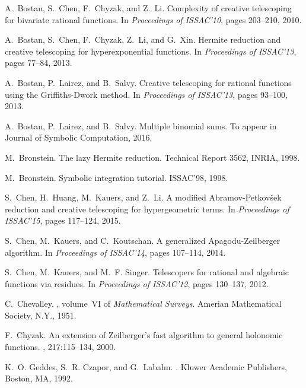 \documentclass{sig-alternate}
\begin{document}
\begin{thebibliography}{10}

A.~Bostan, S.~Chen, F.~Chyzak, and Z.~Li.
\newblock Complexity of creative telescoping for bivariate rational functions.
\newblock In {\em Proceedings of ISSAC'10}, pages 203--210, 2010.

A.~Bostan, S.~Chen, F.~Chyzak, Z.~Li, and G.~Xin.
\newblock Hermite reduction and creative telescoping for hyperexponential
  functions.
\newblock In {\em Proceedings of ISSAC'13}, pages 77--84, 2013.

A.~Bostan, P.~Lairez, and B.~Salvy.
\newblock Creative telescoping for rational functions using the
  {G}riffiths-{D}work method.
\newblock In {\em Proceedings of ISSAC'13}, pages 93--100, 2013.

A.~Bostan, P.~Lairez, and B.~Salvy.
\newblock Multiple binomial sums.
\newblock To appear in {J}ournal of {S}ymbolic {C}omputation, 2016.


M.~Bronstein.
\newblock The lazy {H}ermite reduction.
\newblock Technical Report 3562, INRIA, 1998.

M.~Bronstein.
\newblock Symbolic integration tutorial.
\newblock ISSAC'98, 1998.

S.~Chen, H.~Huang, M.~Kauers, and Z.~Li.
\newblock A modified {A}bramov-{P}etkov\v{s}ek reduction and creative
  telescoping for hypergeometric terms.
\newblock In {\em Proceedings of ISSAC'15}, pages 117--124, 2015.

S.~Chen, M.~Kauers, and C.~Koutschan.
\newblock A generalized {A}pagodu-{Z}eilberger algorithm.
\newblock In {\em Proceedings of ISSAC'14}, pages 107--114, 2014.

S.~Chen, M.~Kauers, and M.~F. Singer.
\newblock Telescopers for rational and algebraic functions via residues.
\newblock In {\em Proceedings of ISSAC'12}, pages 130--137, 2012.

C.~Chevalley.
, volume~VI of {\em Mathematical Surveys}.
\newblock Amerian Mathematical Society, N.Y., 1951.

F.~Chyzak.
\newblock An extension of {Z}eilberger's fast algorithm to general holonomic
  functions.
, 217:115--134, 2000.

K.~O. Geddes, S.~R. Czapor, and G.~Labahn.
.
\newblock Kluwer Academic Publishers, Boston, MA, 1992.


\end{thebibliography}
\end{document}
